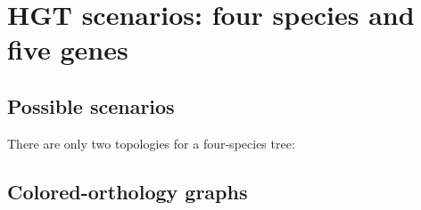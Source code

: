 \documentclass[10pt,a4paper,notitlepage]{article}
\begin{document}
%
%
%			
%		
%		
%		
%		
\section{HGT scenarios: four species and five genes}	

\subsection{Possible scenarios}

There are only two topologies for a four-species tree:


\subsection{Colored-orthology graphs}
\end{document}
